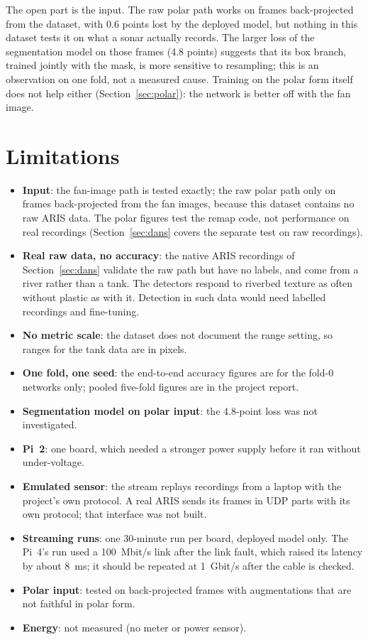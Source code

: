 \documentclass[11pt,a4paper]{article}
\begin{document}
The open part is the input. The raw polar path works on frames
back-projected from the dataset, with 0.6 points lost by the deployed
model, but nothing in this dataset tests it on what a sonar actually
records. The larger loss of the segmentation model on those frames
(4.8 points) suggests that its box branch, trained jointly with the mask,
is more sensitive to resampling; this is an observation on one fold, not
a measured cause. Training on the polar form itself does not help either
(Section~\ref{sec:polar}): the network is better off with the fan image.

\section{Limitations}

\begin{itemize}
  \item \textbf{Input}: the fan-image path is tested exactly; the raw polar
        path only on frames back-projected from the fan images, because this
        dataset contains no raw ARIS data. The polar figures test the remap
        code, not performance on real recordings
        (Section~\ref{sec:dans} covers the separate test on raw recordings).
  \item \textbf{Real raw data, no accuracy}: the native ARIS recordings of
        Section~\ref{sec:dans} validate the raw path but have no labels,
        and come from a river rather than a tank. The detectors respond to
        riverbed texture as often without plastic as with it. Detection in
        such data would need labelled recordings and fine-tuning.
  \item \textbf{No metric scale}: the dataset does not document the range
        setting, so ranges for the tank data are in pixels.
  \item \textbf{One fold, one seed}: the end-to-end accuracy figures are
        for the fold-0 networks only; pooled five-fold figures are in the
        project report.
  \item \textbf{Segmentation model on polar input}: the 4.8-point loss was
        not investigated.
  \item \textbf{Pi~2}: one board, which needed a stronger power supply
        before it ran without under-voltage.
  \item \textbf{Emulated sensor}: the stream replays recordings from a
        laptop with the project's own protocol. A real ARIS sends its frames
        in UDP parts with its own protocol; that interface was not built.
  \item \textbf{Streaming runs}: one 30-minute run per board, deployed
        model only. The Pi~4's run used a 100~Mbit/s link after the link
        fault, which raised its latency by about 8~ms; it should be
        repeated at 1~Gbit/s after the cable is checked.
  \item \textbf{Polar input}: tested on back-projected frames with
        augmentations that are not faithful in polar form.
  \item \textbf{Energy}: not measured (no meter or power sensor).
\end{itemize}
\end{document}
